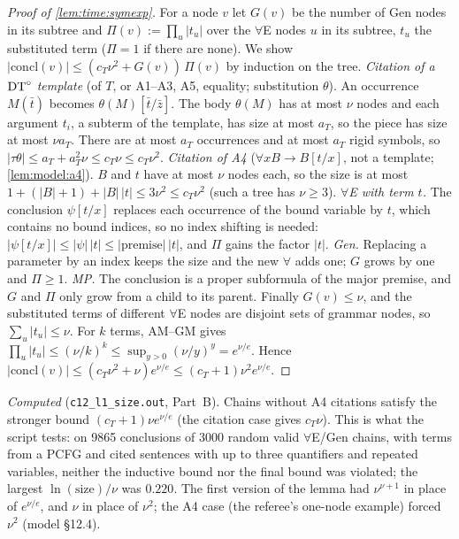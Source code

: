 \begin{proof}[Proof of \cref{lem:time:symexp}]
For a node $v$ let $G(v)$ be the number of Gen nodes in its subtree and $\Pi(v):=\prod_u|t_u|$ over the $\forall$E nodes $u$ in its subtree, $t_u$ the substituted term ($\Pi=1$ if there are none). We show $|\mathrm{concl}(v)|\le(c_T\nu^2+G(v))\,\Pi(v)$ by induction on the tree.
\emph{Citation of a $\mathrm{DT}^{\circ}$ template} (of $T$, or A1--A3, A5, equality; substitution $\theta$). An occurrence $M(\bar t)$ becomes $\theta(M)[\bar t/\bar z]$. The body $\theta(M)$ has at most $\nu$ nodes and each argument $t_i$, a subterm of the template, has size at most $a_T$, so the piece has size at most $\nu a_T$. There are at most $a_T$ occurrences and at most $a_T$ rigid symbols, so $|\tau\theta|\le a_T+a_T^2\nu\le c_T\nu\le c_T\nu^2$.
\emph{Citation of A4} ($\forall xB\to B[t/x]$, not a template; \cref{lem:model:a4}). $B$ and $t$ have at most $\nu$ nodes each, so the size is at most $1+(|B|+1)+|B|\,|t|\le3\nu^2\le c_T\nu^2$ (such a tree has $\nu\ge3$).
\emph{$\forall$E with term $t$.} The conclusion $\psi[t/x]$ replaces each occurrence of the bound variable by $t$, which contains no bound indices, so no index shifting is needed: $|\psi[t/x]|\le|\psi|\,|t|\le|\mathrm{premise}|\,|t|$, and $\Pi$ gains the factor $|t|$.
\emph{Gen.} Replacing a parameter by an index keeps the size and the new $\forall$ adds one; $G$ grows by one and $\Pi\ge1$.
\emph{MP.} The conclusion is a proper subformula of the major premise, and $G$ and $\Pi$ only grow from a child to its parent.
Finally $G(v)\le\nu$, and the substituted terms of different $\forall$E nodes are disjoint sets of grammar nodes, so $\sum_u|t_u|\le\nu$. For $k$ terms, AM--GM gives $\prod_u|t_u|\le(\nu/k)^k\le\sup_{y>0}(\nu/y)^y=e^{\nu/e}$. Hence $|\mathrm{concl}(v)|\le(c_T\nu^2+\nu)e^{\nu/e}\le(c_T+1)\nu^2e^{\nu/e}$.
\end{proof}

\emph{Computed} (\texttt{c12\_l1\_size.out}, Part~B). Chains without A4 citations satisfy the stronger bound $(c_T+1)\nu e^{\nu/e}$ (the citation case gives $c_T\nu$). This is what the script tests: on 9865 conclusions of 3000 random valid $\forall$E/Gen chains, with terms from a PCFG and cited sentences with up to three quantifiers and repeated variables, neither the inductive bound nor the final bound was violated; the largest $\ln(\text{size})/\nu$ was $0.220$. The first version of the lemma had $\nu^{\nu+1}$ in place of $e^{\nu/e}$, and $\nu$ in place of $\nu^2$; the A4 case (the referee's one-node example) forced $\nu^2$ (model \S12.4).

